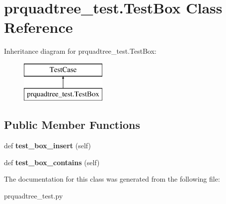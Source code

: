 \hypertarget{classprquadtree__test_1_1TestBox}{}\section{prquadtree\+\_\+test.\+Test\+Box Class Reference}
\label{classprquadtree__test_1_1TestBox}
Inheritance diagram for prquadtree\+\_\+test.\+Test\+Box\+:\begin{figure}[H]
\begin{center}
\leavevmode
\includegraphics[height=2.000000cm]{classprquadtree__test_1_1TestBox}
\end{center}
\end{figure}
\subsection*{Public Member Functions}
\begin{DoxyCompactItemize}
\item 
\hypertarget{classprquadtree__test_1_1TestBox_a58d746adb6903ff58eaf60bcaa08f4d4}{}def {\bfseries test\+\_\+box\+\_\+insert} (self)\label{classprquadtree__test_1_1TestBox_a58d746adb6903ff58eaf60bcaa08f4d4}

\item 
\hypertarget{classprquadtree__test_1_1TestBox_a059049f736a1ff093f4e0b3e5ed67f00}{}def {\bfseries test\+\_\+box\+\_\+contains} (self)\label{classprquadtree__test_1_1TestBox_a059049f736a1ff093f4e0b3e5ed67f00}

\end{DoxyCompactItemize}


The documentation for this class was generated from the following file\+:\begin{DoxyCompactItemize}
\item 
prquadtree\+\_\+test.\+py\end{DoxyCompactItemize}
